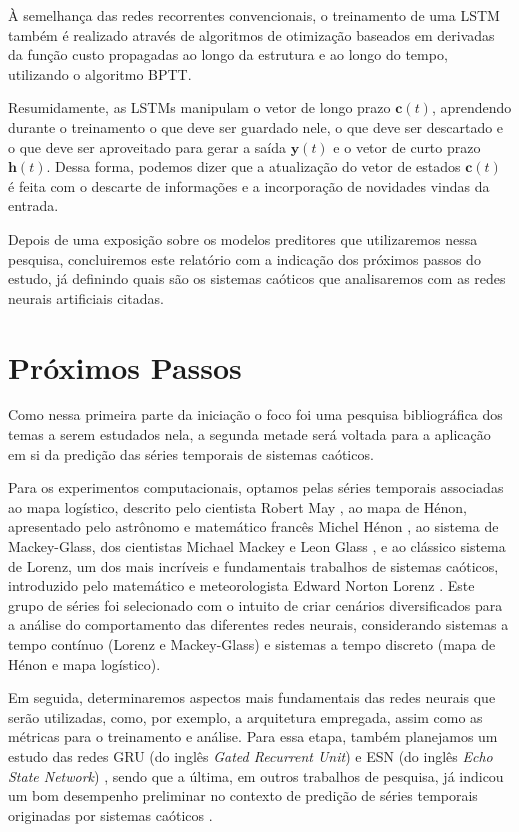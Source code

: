 \documentclass[a4paper, 12pt]{article}
\begin{document}
À semelhança das redes recorrentes convencionais, o treinamento de uma LSTM também é realizado através de algoritmos de otimização baseados em derivadas da função custo propagadas ao longo da estrutura e ao longo do tempo, utilizando o algoritmo BPTT.

Resumidamente, as LSTMs manipulam o vetor de longo prazo $\mathbf{c}(t)$, aprendendo durante o treinamento o que deve ser guardado nele, o que deve ser descartado e o que deve ser aproveitado para gerar a saída $\mathbf{y}(t)$ e o vetor de curto prazo $\mathbf{h}(t)$. Dessa forma, podemos dizer que a atualização do vetor de estados $\mathbf{c}(t)$ é feita com o descarte de informações e a incorporação de novidades vindas da entrada.

Depois de uma exposição sobre os modelos preditores que utilizaremos nessa pesquisa, concluiremos este relatório com a indicação dos próximos passos do estudo, já definindo quais são os sistemas caóticos que analisaremos com as redes neurais artificiais citadas.

\section{Próximos Passos}

Como nessa primeira parte da iniciação o foco foi uma pesquisa bibliográfica dos temas a serem estudados nela, a segunda metade será voltada para a aplicação em si da predição das séries temporais de sistemas caóticos.

Para os experimentos computacionais, optamos pelas séries temporais associadas ao  mapa logístico, descrito pelo cientista Robert May \cite{may1976simple}, ao mapa de Hénon, apresentado pelo astrônomo e matemático francês Michel Hénon \cite{henon1976two}, ao sistema de Mackey-Glass, dos cientistas Michael Mackey e Leon Glass \cite{mackey1977oscillation}, e ao clássico sistema de Lorenz, um dos  mais incríveis e fundamentais trabalhos de sistemas caóticos, introduzido pelo matemático e meteorologista Edward Norton Lorenz \cite{lorenz1963deterministic}. Este grupo de séries foi selecionado com o intuito de criar cenários diversificados para a análise do comportamento das diferentes redes neurais, considerando sistemas a tempo contínuo (Lorenz e Mackey-Glass) e sistemas a tempo discreto (mapa de Hénon e mapa logístico). 

Em seguida, determinaremos aspectos mais fundamentais das redes neurais que serão utilizadas, como, por exemplo, a arquitetura empregada, assim como as métricas para o treinamento e análise. Para essa etapa, também planejamos um estudo das redes GRU (do inglês \textit{Gated Recurrent Unit}) \cite{cho2014learning} e ESN (do inglês \textit{Echo State Network}) \cite{jaeger2007echo}, sendo que a última, em outros trabalhos de pesquisa, já indicou um bom desempenho preliminar no contexto de predição de séries temporais originadas por sistemas caóticos \cite{boccato2013novas}.
\end{document}
